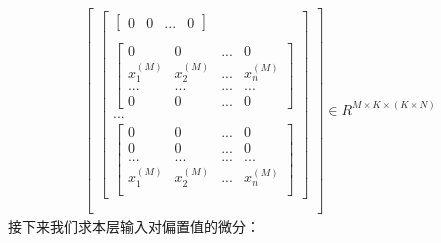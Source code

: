 \documentclass[UTF8]{article}
\begin{document}
\begin{equation}
\begin{aligned}
\begin{bmatrix}
\begin{bmatrix}
\begin{bmatrix}
 0 & 0 & ... & 0
 \end{bmatrix} \\ \\
 \begin{bmatrix}
 0 & 0 & ... & 0 \\
 x_{1}^{(M)} & x_{2}^{(M)} & ... & x_{n}^{(M)} \\
 ... & ... & ... & ... \\
 0 & 0 & ... & 0
 \end{bmatrix} \\
 ... \\
 \begin{bmatrix}
 0 & 0 & ... & 0 \\
 0 & 0 & ... & 0 \\
 ... & ... & ... & ... \\
 x_{1}^{(M)} & x_{2}^{(M)} & ... & x_{n}^{(M)} \\
 \end{bmatrix}
 \end{bmatrix} \\ \\
\end{bmatrix} \in R^{M \times K \times (K \times N)}
\end{aligned}
\label{mlp-pZ-pW-def}
\end{equation}
接下来我们求本层输入对偏置值的微分：
\end{document}
